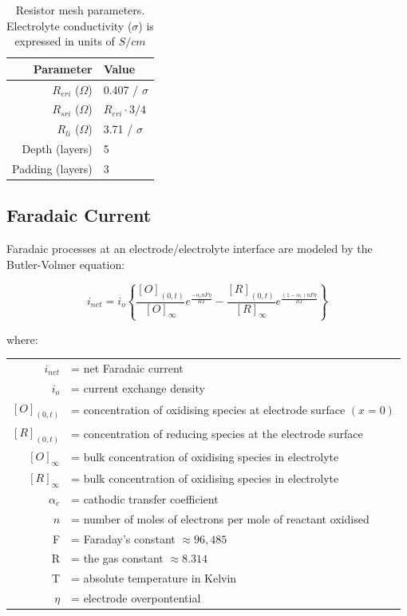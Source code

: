         \begin{table}
          \centering
          \begin{tabular}{r | l}
            Parameter & Value \\
            \hline
            $R_{eri}$ ($\Omega$)& 0.407 / $\sigma$\\
            $R_{sri}$ ($\Omega$)& $R_{eri}\cdot 3/4$\\
            $R_{li}$ ($\Omega$)& 3.71 / $\sigma$ \\
            Depth (layers) & 5 \\
            Padding (layers) & 3 \\
          \end{tabular}
          \caption{\label{tab:RESparams}Resistor mesh parameters. Electrolyte conductivity ($\sigma$) is expressed in units of $S / cm$}
        \end{table}

    \subsection{Faradaic Current}

        Faradaic processes at an electrode/electrolyte interface are modeled
        by the Butler-Volmer equation:

        \begin{equation}
        i_{net}=i_{o}\left\{ \frac{[O]_{(0,t)}}{[O]_{\infty}}e^{\frac{-\alpha_{c}nF\eta}{RT}}-\frac{[R]_{(0,t)}}{[R]_{\infty}}e^{\frac{(1-\alpha_{c})nF\eta}{RT}}\right\}
        \end{equation}


        where:

        \begin{tabular}{rl}
        $i_{net}$ & = net Faradaic current\tabularnewline
        $i_{o}$ & = current exchange density\tabularnewline
        $[O]_{(0,t)}$ & = concentration of oxidising species at electrode surface $(x=0)$\tabularnewline
        $[R]_{(0,t)}$ & = concentration of reducing species at the electrode surface\tabularnewline
        $[O]_{\infty}$ & = bulk concentration of oxidising species in electrolyte\tabularnewline
        $[R]_{\infty}$ & = bulk concentration of oxidising species in electrolyte\tabularnewline
        $\alpha_{c}$ & = cathodic transfer coefficient\tabularnewline
        $n$ & = number of moles of electrons per mole of reactant oxidised\tabularnewline
        F & = Faraday's constant $\approx96,485$\tabularnewline
        R & = the gas constant $\approx8.314$\tabularnewline
        T & = absolute temperature in Kelvin\tabularnewline
        $\eta$ & = electrode overpontential\tabularnewline
        \end{tabular}


